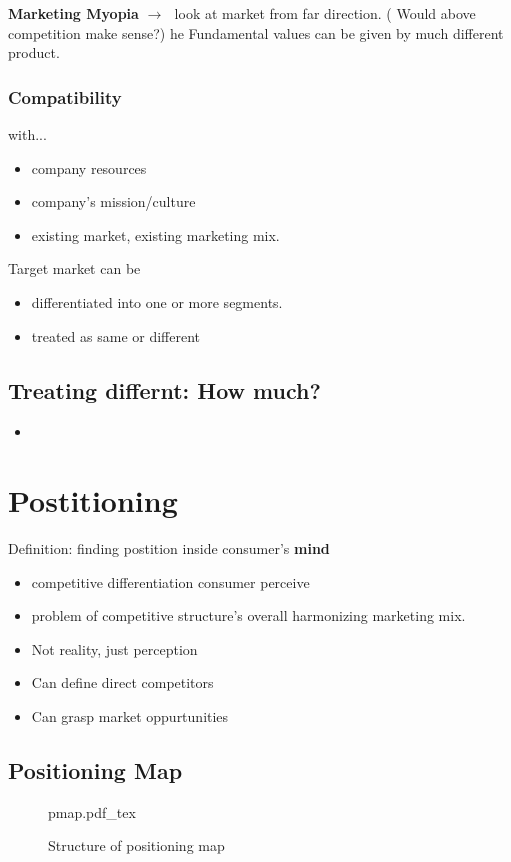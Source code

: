\documentclass[12pt]{article}
\newcommand{\ra}{$\rightarrow \text{ }$}
\begin{document}
{\Huge \textbf{Marketing Myopia}}
\ra look at market from far direction. ( Would above competition make sense?)
he Fundamental values can be given by much different product.
\subsubsection{Compatibility}
with...
\begin{itemize}
	\item company resources
	\item company's mission/culture
	\item existing market, existing marketing mix.
\end{itemize}

Target market can be
\begin{itemize}
	\item differentiated into one or more segments.
	\item treated as same or different
\end{itemize}

\subsection{Treating differnt: How much?}
\begin{itemize}
	\item
\end{itemize}

\section{Postitioning}
Definition: finding postition inside consumer's \textbf{mind}

\begin{itemize}
	\item competitive differentiation consumer perceive
	\item problem of competitive structure's overall harmonizing marketing mix.
	\item Not reality, just perception
	\item Can define direct competitors
	\item Can grasp market oppurtunities
\end{itemize}
\subsection{Positioning Map}

\begin{figure}[H]
	\centering
	\def\svgwidth{\columnwidth}
	{pmap.pdf_tex}
	\caption{Structure of positioning map}
	\label{fig:pmap}
\end{figure}
\end{document}
